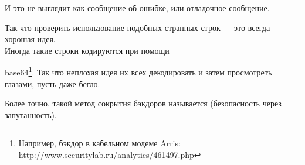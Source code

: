 И это не выглядит как сообщение об ошибке, или отладочное сообщение.

Так что проверить использование подобных странных строк --- это всегда хорошая идея.
\\
Иногда такие строки кодируются при помощи

base64\footnote{Например, бэкдор в кабельном модеме Arris: 
\url{http://www.securitylab.ru/analytics/461497.php}}.
Так что неплохая идея их всех декодировать и затем просмотреть глазами, пусть даже бегло.
\\

Более точно, такой метод сокрытия бэкдоров называется  (безопасность через
запутанность).
